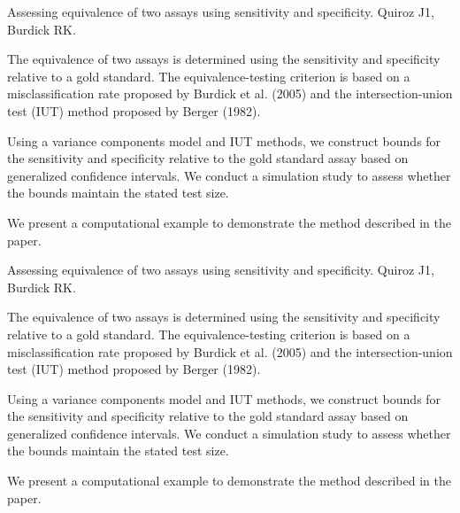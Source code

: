 Assessing equivalence of two assays using sensitivity and specificity.
Quiroz J1, Burdick RK.


The equivalence of two assays is determined using the sensitivity and specificity relative to a gold standard.
The equivalence-testing criterion is based on a misclassification rate proposed by Burdick et al. (2005) and
the intersection-union test (IUT) method proposed by Berger (1982). 

Using a variance components model and IUT methods, we construct bounds for the sensitivity and specificity 
relative to the gold standard assay based on generalized confidence intervals. We conduct a simulation study 
to assess whether the bounds maintain the stated test size. 

We present a computational example to demonstrate the method described in the paper.

Assessing equivalence of two assays using sensitivity and specificity.
Quiroz J1, Burdick RK.


The equivalence of two assays is determined using the sensitivity and specificity relative to a gold standard.
The equivalence-testing criterion is based on a misclassification rate proposed by Burdick et al. (2005) and
the intersection-union test (IUT) method proposed by Berger (1982). 

Using a variance components model and IUT methods, we construct bounds for the sensitivity and specificity 
relative to the gold standard assay based on generalized confidence intervals. We conduct a simulation study 
to assess whether the bounds maintain the stated test size. 

We present a computational example to demonstrate the method described in the paper.

